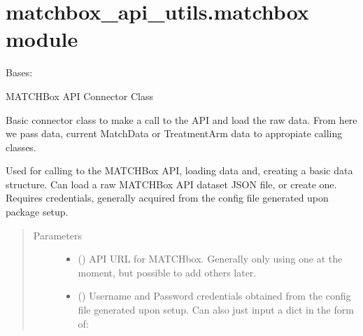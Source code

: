 \documentclass[letterpaper,10pt,english]{sphinxmanual}
\begin{document}
\section{matchbox\_api\_utils.matchbox module}
\label{\detokenize{matchbox_api_utils:module-matchbox_api_utils.matchbox}}\label{\detokenize{matchbox_api_utils:matchbox-api-utils-matchbox-module}}

\begin{fulllineitems}
\label{\detokenize{matchbox_api_utils:matchbox_api_utils.matchbox.Matchbox}}
Bases: 

MATCHBox API Connector Class

Basic connector class to make a call to the API and load the raw data. From
here we pass data, current MatchData or TreatmentArm data to appropiate
calling classes.

Used for calling to the MATCHBox API, loading data and, creating a basic
data structure. Can load a raw MATCHBox API dataset JSON file, or create
one.  Requires credentials, generally acquired from the config file generated
upon package setup.
\begin{quote}\begin{description}
\item[{Parameters}] \leavevmode\begin{itemize}
\item {} 
 () \textendash{} API URL for MATCHbox. Generally only using one at the moment,
but possible to add others later.

\item {} 
 () \textendash{} 
Username and Password credentials obtained from the config
file generated upon setup. Can also just input a dict in the form
of:

%
\begin{sphinxVerbatim}[commandchars=\\\{\}]
       
\end{sphinxVerbatim}



\end{itemize}
\end{description}
\end{quote}
\end{fulllineitems}
\end{document}
